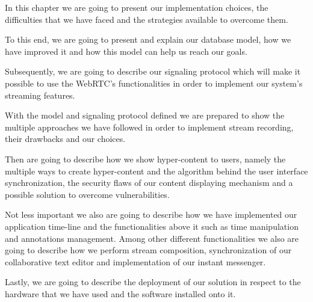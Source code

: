 
In this chapter we are going to present our implementation choices, the difficulties that we have faced and the strategies available to overcome them.

To this end, we are going to present and explain our database model, how we have improved it and how this model can help us reach our goals. 

Subsequently, we are going to describe our signaling protocol which will make it possible to use the \ac{WebRTC}'s functionalities in order to implement our system's streaming features.

With the model and signaling protocol defined we are prepared to show the multiple approaches we have followed in order to implement stream recording, their drawbacks and our choices.

Then are going to describe how we show hyper-content to users, namely the multiple ways to create hyper-content and the algorithm behind the user interface synchronization, the security flaws of our content displaying mechanism and a possible solution to overcome vulnerabilities. 

Not less important we also are going to describe how we have implemented our application time-line and the functionalities above it such as time manipulation and annotations management. Among other different functionalities we also are going to describe how we perform stream composition, synchronization of our collaborative text editor and implementation of our instant messenger.

Lastly, we are going to describe the deployment of our solution in respect to the hardware that we have used and the software installed onto it.







